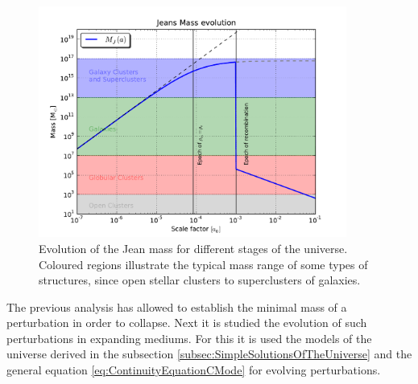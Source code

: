\begin{figure}[htbp]
	\centering
	\includegraphics[width=0.9\textwidth]
	{./figures/2_theoretical_framework/Jeans_Mass_Evolution.pdf}

	\caption{\small{Evolution of the Jean mass for different stages of the
	universe. Coloured regions illustrate the typical mass range of some 
	types of structures, since open stellar clusters to superclusters of 
	galaxies.}}
	
	\label{fig:JeansMass}
\end{figure}
	

The previous analysis has allowed to establish the minimal mass of a 
perturbation in order to collapse. Next it is studied the evolution of 
such perturbations in expanding mediums. For this it is used the models of 
the universe derived in the subsection 
\ref{subsec:SimpleSolutionsOfTheUniverse} and the general equation 
\ref{eq:ContinuityEquationCMode} for evolving perturbations.



